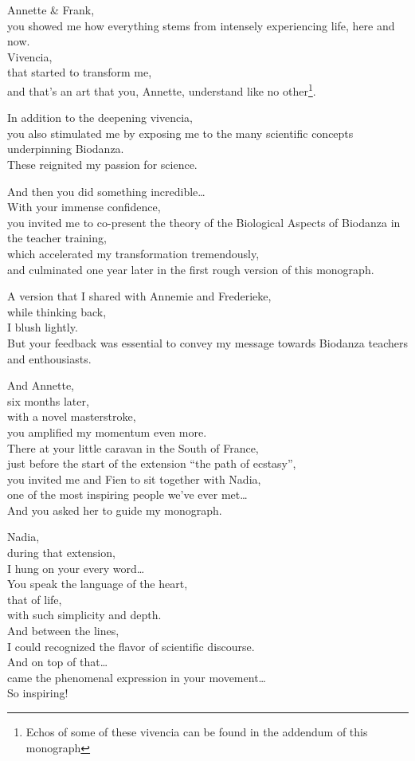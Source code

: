 \documentclass[
  11pt,
]{book}
\begin{document}
Annette \& Frank,\\
you showed me how everything stems from intensely experiencing life, here and now.\\
Vivencia,\\
that started to transform me,\\
and that's an art that you, Annette, understand like no other\footnote{Echos of some of these vivencia can be found in the addendum of this monograph}.

In addition to the deepening vivencia,\\
you also stimulated me by exposing me to the many scientific concepts underpinning Biodanza.\\
These reignited my passion for science.

And then you did something incredible\ldots{}\\
With your immense confidence,\\
you invited me to co-present the theory of the Biological Aspects of Biodanza in the teacher training,\\
which accelerated my transformation tremendously,\\
and culminated one year later in the first rough version of this monograph.

A version that I shared with Annemie and Frederieke,\\
while thinking back,\\
I blush lightly.\\
But your feedback was essential to convey my message towards Biodanza teachers and enthousiasts.

And Annette,\\
six months later,\\
with a novel masterstroke,\\
you amplified my momentum even more.\\
There at your little caravan in the South of France,\\
just before the start of the extension ``the path of ecstasy'',\\
you invited me and Fien to sit together with Nadia,\\
one of the most inspiring people we've ever met\ldots{}\\
And you asked her to guide my monograph.

Nadia,\\
during that extension,\\
I hung on your every word\ldots{}\\
You speak the language of the heart,\\
that of life,\\
with such simplicity and depth.\\
And between the lines,\\
I could recognized the flavor of scientific discourse.\\
And on top of that\ldots{}\\
came the phenomenal expression in your movement\ldots{}\\
So inspiring!
\end{document}
